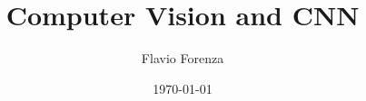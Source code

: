 \documentclass[letterpaper,12pt]{article}
\begin{document}
    
\title{Computer Vision and CNN}
\author{Flavio Forenza}
\date\today
\maketitle
\end{document}
